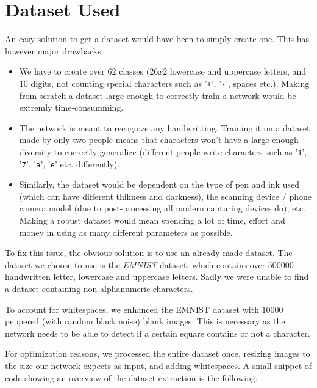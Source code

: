 \documentclass[11pt, a4paper]{report}
\def\code#1{\texttt{#1}}
\begin{document}
\section{Dataset Used}

An easy solution to get a dataset would have been to simply create one. This has however major drawbacks:
\begin{itemize}
	\item We have to create over $62$ classes ($26 x 2$ lowercase and uppercase letters, and $10$ digits, not counting special characters such as '\code{+}', '\code{-}', spaces etc.). Making from scratch a dataset large enough to correctly train a network would be extremly time-consumming.
	\item The network is meant to recognize any handwritting. Training it on a dataset made by only two people means that characters won't have a large enough diversity to correctly generalize (different people write characters such as '\code{1}', '\code{7}', '\code{a}', '\code{e}' etc. differently).
	\item Similarly, the dataset would be dependent on the type of pen and ink used (which can have different thikness and darkness), the scanning device / phone camera model (due to post-processing all modern capturing devices do), etc. Making a robust dataset would mean spending a lot of time, effort and money in using as many different parameters as possible. 
\end{itemize}

To fix this issue, the obvious solution is to use an already made dataset.
The dataset we choose to use is the \textit{EMNIST}\cite{emnist} dataset, which contains over $500000$ handwritten letter, lowercase and uppercase letters. Sadly we were unable to find a dataset containing non-alphanumeric characters.

To account for whitespaces, we enhanced the EMNIST dataset with $10000$ peppered (with random black noise) blank images. This is necessary as the network needs to be able to detect if a certain square contains or not a character.

For optimization reasons, we processed the entire dataset once, resizing images to the size our network expects as input, and adding whitespaces. A small snippet of code showing an overview of the dataset extraction is the following:
\end{document}
